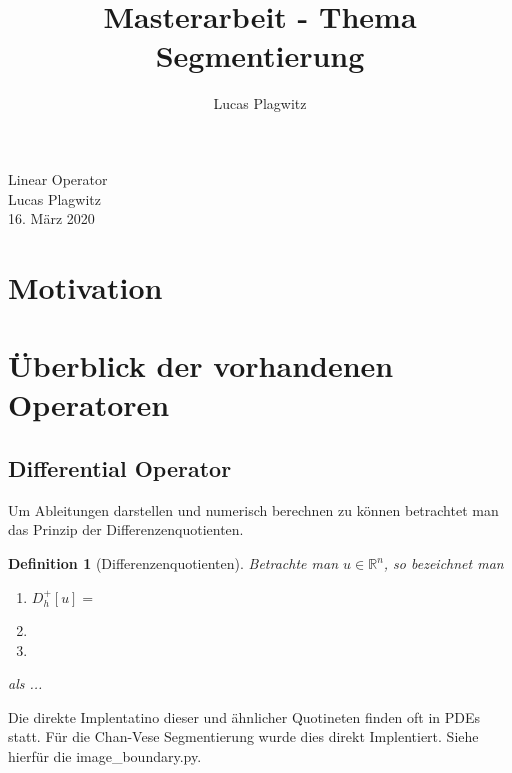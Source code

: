 \documentclass[a4paper,10pt]{article}
\title{Masterarbeit - Thema Segmentierung}
\author{Lucas Plagwitz}
\date{}
\def\bb{\mathbb}
\newtheorem{dfn}{Definition}
\begin{document}
	
\begin{center}
	\Large{Linear Operator} \\
	\normalsize	Lucas Plagwitz \\
	16. März 2020
\end{center}




\section{Motivation}

\section{Überblick der vorhandenen Operatoren}



\subsection{Differential Operator}
Um Ableitungen darstellen und numerisch berechnen zu können betrachtet man das Prinzip der Differenzenquotienten.
\begin{dfn}[Differenzenquotienten]
	Betrachte man $u \in \bb R^n$, so bezeichnet man
	\begin{enumerate}
		\item $D_h^+[u] = $
		\item
		\item
	\end{enumerate}
	als ...
\end{dfn}
Die direkte Implentatino dieser und ähnlicher Quotineten finden oft in PDEs statt. Für die Chan-Vese Segmentierung wurde dies direkt Implentiert. Siehe hierfür die image\_boundary.py.
\end{document}
